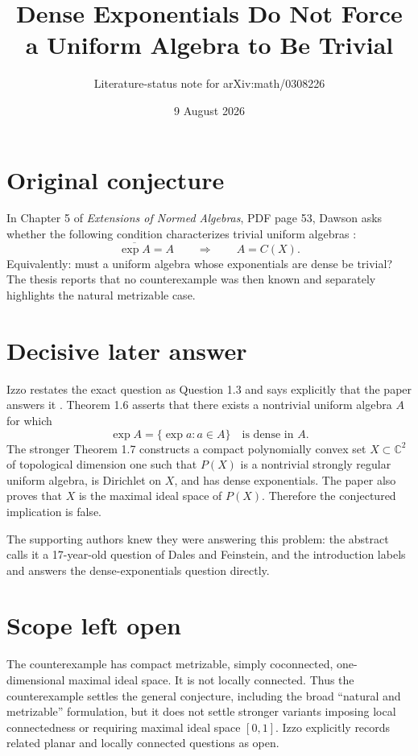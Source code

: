 \documentclass[11pt]{article}
\title{Dense Exponentials Do Not Force a Uniform Algebra to Be Trivial}
\author{Literature-status note for arXiv:math/0308226}
\date{9 August 2026}
\begin{document}
\maketitle

\begin{center}
\end{center}

\section*{Original conjecture}

In Chapter 5 of \emph{Extensions of Normed Algebras}, PDF page 53,
Dawson asks whether the following condition characterizes trivial uniform
algebras \cite{Dawson}:
\[
\overline{\exp A}=A
\qquad\Longrightarrow\qquad
A=C(X).
\]
Equivalently: must a uniform algebra whose exponentials are dense be trivial?
The thesis reports that no counterexample was then known and separately
highlights the natural metrizable case.

\section*{Decisive later answer}

Izzo restates the exact question as Question 1.3 and says explicitly that the
paper answers it \cite{Izzo}.  Theorem 1.6 asserts that there exists a
nontrivial uniform algebra $A$ for which
\[
\exp A=\{\exp a:a\in A\}
\quad\text{is dense in }A.
\]
The stronger Theorem 1.7 constructs a compact polynomially convex set
$X\subset\mathbb C^2$ of topological dimension one such that $P(X)$ is a
nontrivial strongly regular uniform algebra, is Dirichlet on $X$, and has
dense exponentials.  The paper also proves that $X$ is the maximal ideal
space of $P(X)$.  Therefore the conjectured implication is false.

The supporting authors knew they were answering this problem: the abstract
calls it a 17-year-old question of Dales and Feinstein, and the introduction
labels and answers the dense-exponentials question directly.

\section*{Scope left open}

The counterexample has compact metrizable, simply coconnected,
one-dimensional maximal ideal space.  It is not locally connected.  Thus the
counterexample settles the general conjecture, including the broad
``natural and metrizable'' formulation, but it does not settle stronger
variants imposing local connectedness or requiring maximal ideal space
$[0,1]$.  Izzo explicitly records related planar and locally connected
questions as open.
\end{document}
